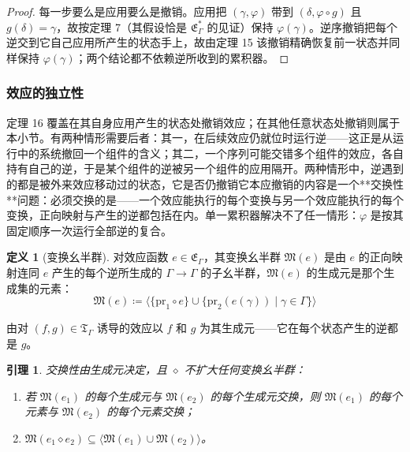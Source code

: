 \documentclass[11pt,a4paper]{article}
\theoremstyle{plain}
\newtheorem{lemma}[theorem]{引理}
\theoremstyle{definition}
\newtheorem{definition}{定义}
\theoremstyle{remark}
\begin{document}
\begin{proof}
每一步要么是应用要么是撤销。应用把 $(\gamma, \varphi)$ 带到 $(\delta, \varphi \circ g)$ 且 $g(\delta) = \gamma$，故按定理 7（其假设恰是 $\mathfrak{E}_\Gamma^\ast$ 的见证）保持 $\varphi(\gamma)$。逆序撤销把每个逆交到它自己应用所产生的状态手上，故由定理 15 该撤销精确恢复前一状态并同样保持 $\varphi(\gamma)$；两个结论都不依赖逆所收到的累积器。
\end{proof}

\subsubsection{效应的独立性}

定理 16 覆盖在其自身应用产生的状态处撤销效应；在其他任意状态处撤销则属于本小节。有两种情形需要后者：其一，在后续效应仍就位时运行逆——这正是从运行中的系统撤回一个组件的含义；其二，一个序列可能交错多个组件的效应，各自持有自己的逆，于是某个组件的逆被另一个组件的应用隔开。两种情形中，逆遇到的都是被外来效应移动过的状态，它是否仍撤销它本应撤销的内容是一个**交换性**问题：必须交换的是——一个效应能执行的每个变换与另一个效应能执行的每个变换，正向映射与产生的逆都包括在内。单一累积器解决不了任一情形：$\varphi$ 是按其固定顺序一次运行全部逆的复合。

\begin{definition}[变换幺半群]
对效应函数 $e \in \mathfrak{E}_\Gamma$，其变换幺半群 $\mathfrak{M}(e)$ 是由 $e$ 的正向映射连同 $e$ 产生的每个逆所生成的 $\Gamma \to \Gamma$ 的子幺半群，$\mathfrak{M}(e)$ 的生成元是那个生成集的元素：
\[
\mathfrak{M}(e) \coloneqq \big\langle \{\mathrm{pr}_1 \circ e\} \cup \{\mathrm{pr}_2(e(\gamma)) \mid \gamma \in \Gamma\} \big\rangle \tag{17}
\]
\end{definition}

由对 $(f, g) \in \mathfrak{T}_\Gamma$ 诱导的效应以 $f$ 和 $g$ 为其生成元——它在每个状态产生的逆都是 $g$。

\begin{lemma}\label{lem:comm-generators}
交换性由生成元决定，且 $\diamond$ 不扩大任何变换幺半群：
\begin{enumerate}
\item 若 $\mathfrak{M}(e_1)$ 的每个生成元与 $\mathfrak{M}(e_2)$ 的每个生成元交换，则 $\mathfrak{M}(e_1)$ 的每个元素与 $\mathfrak{M}(e_2)$ 的每个元素交换；
\item $\mathfrak{M}(e_1 \diamond e_2) \subseteq \langle \mathfrak{M}(e_1) \cup \mathfrak{M}(e_2) \rangle$。
\end{enumerate}
\end{lemma}
\end{document}
